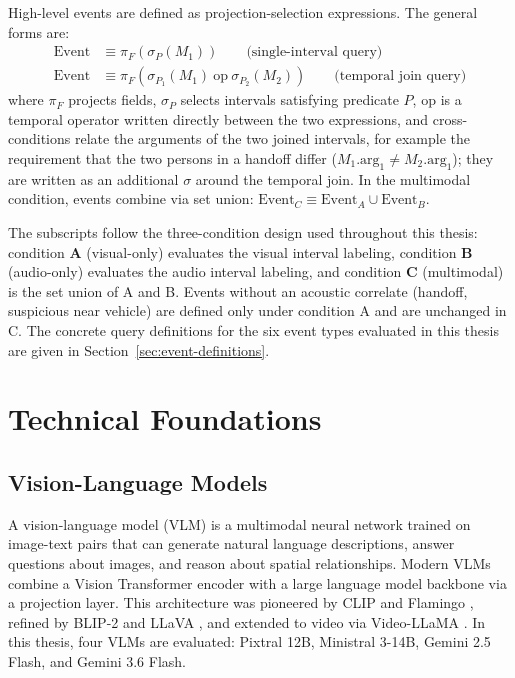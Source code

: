 High-level events are defined as projection-selection expressions. The general forms are:
\[
\begin{aligned}
\text{Event} &\equiv \pi_{F}(\sigma_{P}(M_1)) \qquad \text{(single-interval query)} \\
\text{Event} &\equiv \pi_{F}(\sigma_{P_1}(M_1)\ \mathrm{op}\ \sigma_{P_2}(M_2)) \qquad \text{(temporal join query)}
\end{aligned}
\]
where $\pi_F$ projects fields, $\sigma_P$ selects intervals satisfying predicate $P$, $\mathrm{op}$ is a temporal operator written directly between the two expressions, and cross-conditions relate the arguments of the two joined intervals, for example the requirement that the two persons in a handoff differ ($M_1.\mathrm{arg}_1 \neq M_2.\mathrm{arg}_1$); they are written as an additional $\sigma$ around the temporal join. In the multimodal condition, events combine via set union: $\text{Event}_C \equiv \text{Event}_A \cup \text{Event}_B$.

The subscripts follow the three-condition design used throughout this thesis: condition \textbf{A} (visual-only) evaluates the visual interval labeling, condition \textbf{B} (audio-only) evaluates the audio interval labeling, and condition \textbf{C} (multimodal) is the set union of A and B. Events without an acoustic correlate (handoff, suspicious near vehicle) are defined only under condition A and are unchanged in C. The concrete query definitions for the six event types evaluated in this thesis are given in Section~\ref{sec:event-definitions}.

\section{Technical Foundations}
\label{sec:tech}

\subsection{Vision-Language Models}

A vision-language model (VLM) is a multimodal neural network trained on image-text pairs that can generate natural language descriptions, answer questions about images, and reason about spatial relationships. Modern VLMs combine a Vision Transformer encoder with a large language model backbone via a projection layer. This architecture was pioneered by CLIP \citep{radford2021clip} and Flamingo \citep{alayrac2022flamingo}, refined by BLIP-2 \citep{li2023blip2} and LLaVA \citep{liu2024llava}, and extended to video via Video-LLaMA \citep{zhang2023videollama}. In this thesis, four VLMs are evaluated: Pixtral 12B, Ministral 3-14B, Gemini 2.5 Flash, and Gemini 3.6 Flash.

